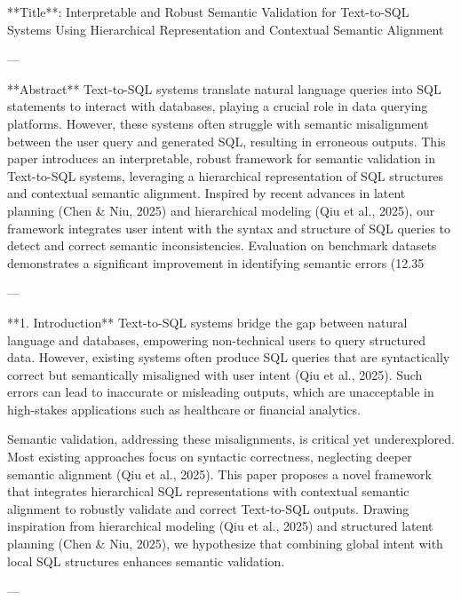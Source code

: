 **Title**: Interpretable and Robust Semantic Validation for Text-to-SQL Systems Using Hierarchical Representation and Contextual Semantic Alignment

---

**Abstract**  
Text-to-SQL systems translate natural language queries into SQL statements to interact with databases, playing a crucial role in data querying platforms. However, these systems often struggle with semantic misalignment between the user query and generated SQL, resulting in erroneous outputs. This paper introduces an interpretable, robust framework for semantic validation in Text-to-SQL systems, leveraging a hierarchical representation of SQL structures and contextual semantic alignment. Inspired by recent advances in latent planning (Chen & Niu, 2025) and hierarchical modeling (Qiu et al., 2025), our framework integrates user intent with the syntax and structure of SQL queries to detect and correct semantic inconsistencies. Evaluation on benchmark datasets demonstrates a significant improvement in identifying semantic errors (12.35%

---

**1. Introduction**  
Text-to-SQL systems bridge the gap between natural language and databases, empowering non-technical users to query structured data. However, existing systems often produce SQL queries that are syntactically correct but semantically misaligned with user intent (Qiu et al., 2025). Such errors can lead to inaccurate or misleading outputs, which are unacceptable in high-stakes applications such as healthcare or financial analytics. 

Semantic validation, addressing these misalignments, is critical yet underexplored. Most existing approaches focus on syntactic correctness, neglecting deeper semantic alignment (Qiu et al., 2025). This paper proposes a novel framework that integrates hierarchical SQL representations with contextual semantic alignment to robustly validate and correct Text-to-SQL outputs. Drawing inspiration from hierarchical modeling (Qiu et al., 2025) and structured latent planning (Chen & Niu, 2025), we hypothesize that combining global intent with local SQL structures enhances semantic validation. 

---

